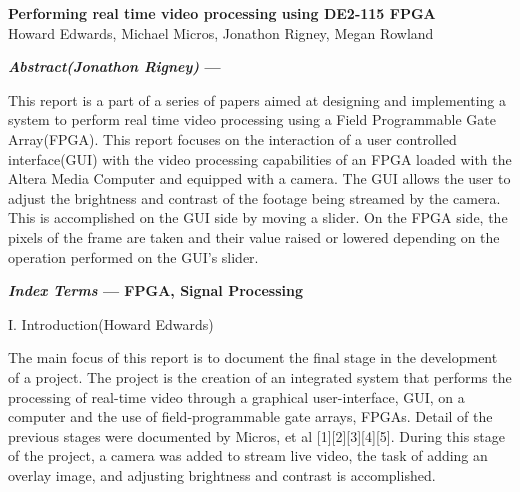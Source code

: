 \documentclass{article}
\begin{document}
\begin{center}

\vspace* {15 pt}
\Huge{\bf Performing real time video processing using DE2-115 FPGA}\\
\vspace {20 pt}
\large{Howard Edwards, Michael Micros, Jonathon  Rigney, Megan Rowland \\}

\end{center}

\vspace{15 pt}




\begin{multicols*}{2}

{\bf  \textit {Abstract(Jonathon Rigney)} ---}
\par This report is a part of a series of papers aimed at designing and implementing a system to perform real time video processing using a Field Programmable Gate Array(FPGA). This report focuses on the interaction of a user controlled interface(GUI) with the video processing capabilities of an FPGA loaded with the Altera Media Computer and equipped with a camera. The GUI allows the user to adjust the brightness and contrast of the footage being streamed by the camera. This is accomplished on the GUI side by moving a slider. On the FPGA side, the pixels of the frame are taken and their value raised or lowered depending on the operation performed on the GUI’s slider.


{\bf  \textit {Index Terms} --- FPGA, Signal Processing}




\begin{center}
\large{I. Introduction(Howard Edwards)}
\end{center}
\par      The main focus of this report is to document the final stage in the development of a project. The project is the creation of an integrated system that performs the processing of real-time video through a graphical user-interface, GUI, on a computer and the use of field-programmable gate arrays, FPGAs. Detail of the previous stages were documented by Micros, et al [1][2][3][4][5]. During this stage of the project, a camera was added to stream live video, the task of adding an overlay image, and adjusting brightness and contrast is accomplished. 


\end{multicols*}
\end{document}
